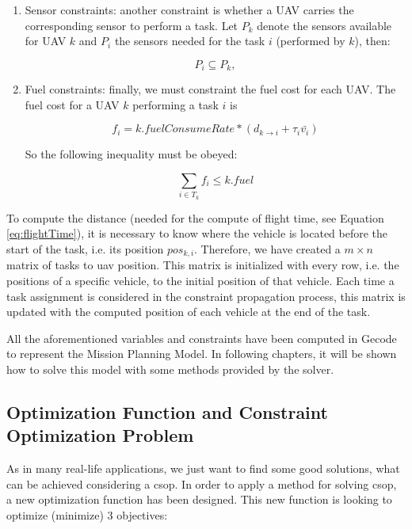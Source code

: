 \begin{enumerate}
\begin{enumerate}

\item Sensor constraints: another constraint is whether a UAV carries the corresponding sensor to perform a task. Let $P_k$ denote the sensors available for UAV $k$ and $P_i$ the sensors needed for the task $i$ (performed by $k$), then:

\begin{equation}
  P_i \subseteq P_k,
\end{equation}

\item Fuel constraints: finally, we must constraint the fuel cost for each UAV. The fuel cost for a UAV $k$ performing a task $i$ is

\begin{equation}\label{eq:fuel}
	f_i=k.fuelConsumeRate * (d_{k \to i} + \tau_i \bar{v_i})
\end{equation}

So the following inequality must be obeyed:

\begin{equation}
  \sum_{i \in T_k} f_i \leqslant k.fuel
\end{equation}

\end{enumerate}

\end{enumerate}

To compute the distance (needed for the compute of flight time, see Equation \ref{eq:flightTime}), it is necessary to know where the vehicle is located before the start of the task, i.e. its position $pos_{k,i}$. Therefore, we have created a $m \times n$ matrix of tasks to \gls{uav} position. This matrix is initialized with every row, i.e. the positions of a specific vehicle, to the initial position of that vehicle. Each time a task assignment is considered in the constraint propagation process, this matrix is updated with the computed position of each vehicle at the end of the task.

All the aforementioned variables and constraints have been computed in Gecode to represent the Mission Planning Model. In following chapters, it will be shown how to solve this model with some methods provided by the solver.


\subsection{Optimization Function and Constraint Optimization Problem}\label{optimization}
As in many real-life applications, we just want to find some good solutions, what can be achieved considering a \gls{csop}. In order to apply a method for solving \gls{csop}, a new optimization function has been designed. This new function is looking to optimize (minimize) 3 objectives:

